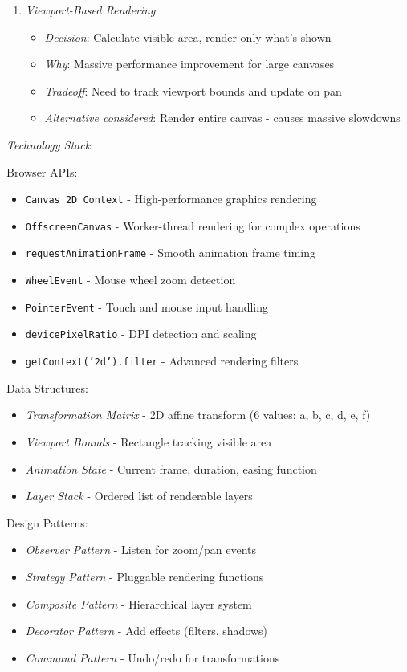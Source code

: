 \documentclass[11pt]{article}
\begin{document}
\begin{enumerate}
\item \emph{Viewport-Based Rendering}

\begin{itemize}
\item \emph{Decision}: Calculate visible area, render only what's shown
\item \emph{Why}: Massive performance improvement for large canvases
\item \emph{Tradeoff}: Need to track viewport bounds and update on pan
\item \emph{Alternative considered}: Render entire canvas - causes massive slowdowns
\end{itemize}
\end{enumerate}

\emph{Technology Stack}:

Browser APIs:

\begin{itemize}
\item \texttt{Canvas 2D Context} - High-performance graphics rendering
\item \texttt{OffscreenCanvas} - Worker-thread rendering for complex operations
\item \texttt{requestAnimationFrame} - Smooth animation frame timing
\item \texttt{WheelEvent} - Mouse wheel zoom detection
\item \texttt{PointerEvent} - Touch and mouse input handling
\item \texttt{devicePixelRatio} - DPI detection and scaling
\item \texttt{getContext('2d').filter} - Advanced rendering filters
\end{itemize}

Data Structures:

\begin{itemize}
\item \emph{Transformation Matrix} - 2D affine transform (6 values: a, b, c, d, e, f)
\item \emph{Viewport Bounds} - Rectangle tracking visible area
\item \emph{Animation State} - Current frame, duration, easing function
\item \emph{Layer Stack} - Ordered list of renderable layers
\end{itemize}

Design Patterns:

\begin{itemize}
\item \emph{Observer Pattern} - Listen for zoom/pan events
\item \emph{Strategy Pattern} - Pluggable rendering functions
\item \emph{Composite Pattern} - Hierarchical layer system
\item \emph{Decorator Pattern} - Add effects (filters, shadows)
\item \emph{Command Pattern} - Undo/redo for transformations
\end{itemize}
\end{document}
